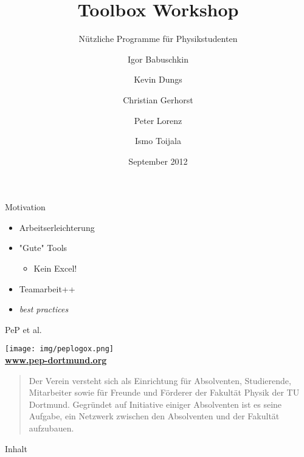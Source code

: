 \documentclass[t]{beamer}
\title{Toolbox Workshop}
\subtitle{Nützliche Programme für Physikstudenten}
\author[Igor B.\and Kevin D.\and Christian G.\and Peter L.\and Ismo T.]{
       Igor Babuschkin%
  \and Kevin Dungs%
  \and Christian Gerhorst%
  \and Peter Lorenz%
  \and Ismo Toijala%
}
\institute[PeP et al. e.V.]{
  PeP et al. e.V.%
}
\date{September 2012}
\begin{document}
  {
    \begin{frame}
      \titlepage
    \end{frame}
  }

  \begin{frame}{Motivation}
    \begin{itemize}
      \item Arbeitserleichterung
      \item "Gute" Tools \begin{itemize}
        \item Kein Excel!
      \end{itemize}
    \item Teamarbeit++
    \item \textit{best practices}
    \end{itemize}  
  \end{frame}

  \begin{frame}{PeP et al.}
    \begin{center}
      \texttt{[image: img/peplogox.png]} \\
      \color{TUgreen}\textbf{\href{http://pep-dortmund.org}{www.pep-dortmund.org}}
    \end{center}
    \begin{quote}
      \begin{spacing}{1.0}
        Der Verein versteht sich als Einrichtung für Absolventen, Studierende, Mitarbeiter sowie für Freunde und Förderer der Fakultät Physik der TU Dortmund. Gegründet auf Initiative einiger Absolventen ist es seine Aufgabe, ein Netzwerk zwischen den Absolventen und der Fakultät aufzubauen.
      \end{spacing}
    \end{quote}
  \end{frame}
  

  \begin{frame}{Inhalt}
    \tableofcontents[subsectionstyle=hide]
  \end{frame}

  
  
  
\end{document}
